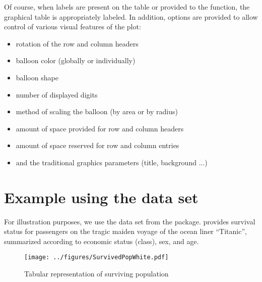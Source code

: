 \documentclass[a4paper]{report}
\begin{document}
\begin{article}
Of course, when labels are present on the table or provided to the
function, the graphical table is appropriately labeled.  In
addition, options are provided to allow control of various visual features
of the plot:

\begin{itemize}
  \item rotation of the row and column headers
  \item balloon color (globally or individually) 
  \item balloon shape 
  \item number of displayed digits
  \item method of scaling the balloon (by area or by radius)
  \item amount of space provided for row and column headers
  \item amount of space reserved for row and column entries
  \item and the traditional graphics parameters (title, background ...)
\end{itemize}

\section*{Example using the  data set}

For illustration purposes, we use the  data set from
the  package.   provides survival status
for passengers on the tragic maiden voyage of the ocean liner
``Titanic'', summarized according to economic status (class), sex, and
age.




\begin{figure}
\texttt{[image: ../figures/SurvivedPopWhite.pdf]}
\vspace*{-0.25in}
\caption{\label{figure:Surv.Pop.White}
Tabular representation of surviving population}
\end{figure}



\end{article}
\end{document}
